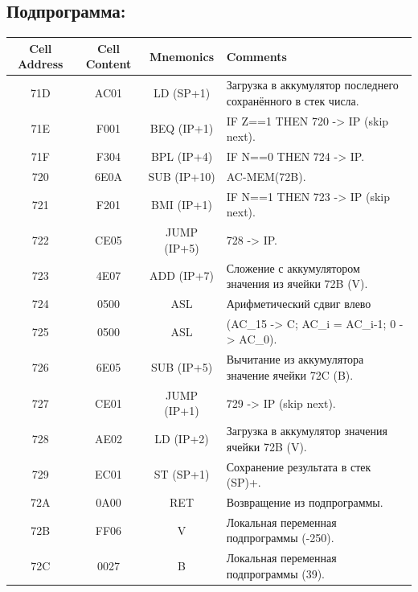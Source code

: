 \newpage

\subsection{Подпрограмма:}
\begin{center}
    \begin{tabular}{|c|c|c|l|}
        \hline
        \textbf{Cell Address} & \textbf{Cell Content} & \textbf{Mnemonics} & \textbf{Comments}                                    \\
        \hline
        71D                   & AC01                  & LD (SP+1)         & Загрузка в аккумулятор последнего сохранённого в стек числа.    \\
        71E                   & F001                  & BEQ (IP+1)        & IF Z==1 THEN 720 -> IP (skip next). \\
        71F                   & F304                  & BPL (IP+4)        & IF N==0 THEN 724 -> IP. \\
        720                   & 6E0A                  & SUB (IP+10)       & AC-MEM(72B). \\
        721                   & F201                  & BMI (IP+1)        & IF N==1 THEN 723 -> IP (skip next). \\
        722                   & CE05                  & JUMP (IP+5)       & 728 -> IP. \\
        723                   & 4E07                  & ADD (IP+7)        & Сложение с аккумулятором значения из ячейки 72B (V). \\
        724                   & 0500                  & ASL               & Арифметический сдвиг влево \\
        725                   & 0500                  & ASL               & (AC_{15} -> C; AC_{i} = AC_{i-1}; 0 -> AC_{0}). \\
        726                   & 6E05                  & SUB (IP+5)        & Вычитание из аккумулятора значение ячейки 72C (B). \\
        727                   & CE01                  & JUMP (IP+1)       & 729 -> IP (skip next). \\
        728                   & AE02                  & LD (IP+2)         & Загрузка в аккумулятор значения ячейки 72B (V). \\
        729                   & EC01                  & ST (SP+1)         & Сохранение результата в стек (SP)+. \\
        72A                   & 0A00                  & RET               & Возвращение из подпрограммы. \\
        \hline
        72B                   & FF06                  & V                 & Локальная переменная подпрограммы (-250). \\
        72C                   & 0027                  & B                 & Локальная переменная подпрограммы (39). \\
        \hline
    \end{tabular}
\end{center}

